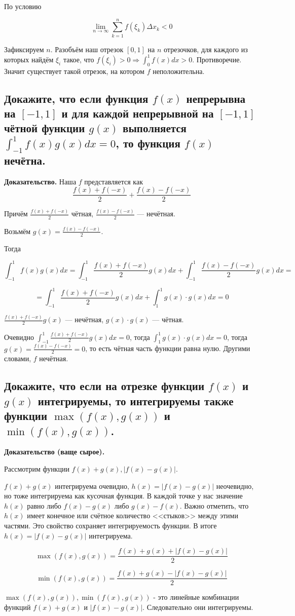 \documentclass[a4paper]{article}
\begin{document}
По условию 

\[ \lim_{n \rightarrow \infty} \sum_{k=1}^n f(\xi_k) \Delta x_k < 0
\]

Зафиксируем $n$. Разобъём наш отрезок $[0,1]$ на $n$ отрезочков, для каждого из которых найдём $\xi_i$ такое, что $f(\xi_i) > 0 \Rightarrow \int_0^1 f(x)dx > 0$. Противоречие. Значит существует такой отрезок, на котором $f$ неположительна.

\subsection{Докажите, что если функция $f(x)$ непрерывна на $[-1,1]$ и для каждой непрерывной на $[-1,1]$ чётной функции $g(x)$ выполняется $\int_{-1}^1 f(x)g(x)dx = 0$, то функция $f(x)$ нечётна.}

\textbf{Доказательство.} Наша $f$ представляется как 
\[
\frac{f(x)+f(-x)}{2} + \frac{f(x)-f(-x)}{2}
\]

Причём $\frac{f(x)+f(-x)}{2}$ чётная, $\frac{f(x)-f(-x)}{2}$ --- нечётная.

Возьмём $g(x) = \frac{f(x)-f(-x)}{2}$.

Тогда 

\[
\int_{-1}^1 f(x)g(x)dx = \int_{-1}^1 \frac{f(x)+f(-x)}{2} g(x) dx + \int_{-1}^1 \frac{f(x)-f(-x)}{2} g(x) dx = 
\]

\[
= \int_{-1}^1 \frac{f(x)+f(-x)}{2} g(x) dx + \int_1^1 g(x) \cdot g(x) dx = 0
\]

$\frac{f(x)+f(-x)}{2} g(x)$ --- нечётная, $g(x)\cdot g(x)$ --- чётная.

Очевидно $\int_{-1}^1 \frac{f(x)+f(-x)}{2} g(x) dx  = 0$, тогда $\int_1^1 g(x)\cdot g(x) dx = 0$, тогда $g(x) = \frac{f(x)-f(-x)}{2} = 0$, то есть чётная часть функции равна нулю. Другими словами, $f$ нечётная.

\subsection{Докажите, что если на отрезке функции $f(x)$ и $g(x)$ интегрируемы, то интегрируемы также функции $\max(f(x), g(x))$ и $\min(f(x), g(x))$.}

\textbf{Доказательство (ваще сырое).} 

Рассмотрим функции $f(x) + g(x), |f(x)-g(x)|$.

$f(x) + g(x)$ интегрируема очевидно, $h(x) = |f(x)-g(x)|$ неочевидно, но тоже интегрируема как кусочная функция. В каждой точке у нас значение $h(x)$ равно либо $f(x)-g(x)$ либо $g(x)-f(x)$. Важно отметить, что $h(x)$ имеет конечное или счётное количество <<стыков>> между этими частями. Это свойство сохраняет интегрируемость функции. В итоге $h(x) = |f(x)-g(x)|$ интегрируема.

\[
\max(f(x),g(x)) = \frac{f(x)+g(x) + |f(x)-g(x)|}{2}
\]

\[
\min(f(x), g(x)) = \frac{f(x)+g(x)-|f(x)-g(x)|}{2}
\]

$\max(f(x),g(x)), \min(f(x), g(x))$ - это линейные комбинации функций $f(x) + g(x)$ и $|f(x)-g(x)|$. Следовательно они интегрируемы.
\end{document}
